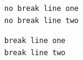 \documentclass{article}
\begin{document}
\begin{Verbatim}[frame=single]
no break line one
no break line two
\end{Verbatim}
\begin{Verbatim}[breaklines=true,frame=single]
break line one
break line two
\end{Verbatim}
\end{document}

